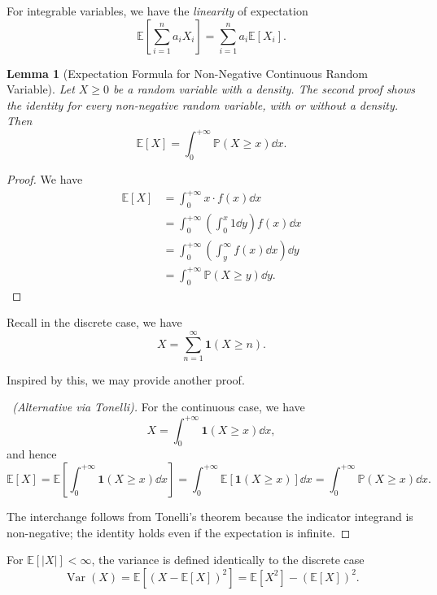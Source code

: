 \documentclass[11pt]{article}
\numberwithin{equation}{section}
\newtheorem{lemma}[theorem]{Lemma}
\theoremstyle{definition}
\theoremstyle{remark}
\newcommand{\pqty}[1]{\left(#1\right)}
\newcommand{\bqty}[1]{\left[#1\right]}
\newcommand{\plusinfty}{+\infty}
\newcommand{\indicator}{\mathbf 1}
\newcommand{\Prob}{\mathbb P}
\newcommand{\Expt}{\mathbb E}
\DeclareMathOperator{\Var}{Var}
\begin{document}
For integrable variables, we have the \emph{linearity} of expectation
\[
    \Expt\bqty{\sum_{i = 1}^{n} a_i X_i} = \sum_{i = 1}^{n} a_i \Expt\bqty{X_i}.
\]

\begin{lemma}[Expectation Formula for Non-Negative Continuous Random Variable]\label{probability-lemma-009}
    \label{probability-lem:formula-expectation-non-negative-continuous-random-variable}
    Let \(X\ge0\) be a random variable with a density. The second proof shows the identity for every non-negative random variable, with or without a density. Then
    \[
        \Expt\bqty{X} = \int_{0}^{\plusinfty} \Prob\pqty{X \geq x} \dd{x}.
    \]
\end{lemma}

\begin{proof}\label{probability-proof-059}
    We have
    \begin{align*}
        \Expt\bqty{X} &= \int_{0}^{\plusinfty} x \cdot f\pqty{x} \dd{x} \\
        &= \int_{0}^{\plusinfty} \pqty{\int_{0}^{x} 1 \dd{y}} f\pqty{x} \dd{x} \\
        &= \int_{0}^{\plusinfty} \pqty{\int_{y}^{\infty} f\pqty{x} \dd{x}} \dd{y} \\
        &= \int_{0}^{\plusinfty} \Prob\pqty{X \geq y} \dd{y}. 
    \end{align*}
\end{proof}

Recall in the discrete case, we have
\[
    X = \sum_{n = 1}^{\infty} \indicator\pqty{X \geq n}.
\]

Inspired by this, we may provide another proof.

\begin{proof}[\proofname\ (Alternative via Tonelli)]\label{probability-proof-060}
    For the continuous case, we have
    \[
        X = \int_{0}^{\plusinfty} \indicator\pqty{X \geq x} \dd{x},
    \]
    and hence
    \[
        \Expt\bqty{X} = \Expt\bqty{\int_{0}^{\plusinfty} \indicator\pqty{X \geq x} \dd{x}} = \int_{0}^{\plusinfty} \Expt\bqty{\indicator\pqty{X \geq x}} \dd{x} = \int_{0}^{\plusinfty} \Prob\pqty{X \geq x} \dd{x}.
    \]

    The interchange follows from Tonelli's theorem because the indicator integrand is non-negative; the identity holds even if the expectation is infinite.
\end{proof}

For \(\Expt[|X|]<\infty\), the variance is defined identically to the discrete case
\[
    \Var\pqty{X} = \Expt\bqty{\pqty{X - \Expt\bqty{X}}^2} = \Expt\bqty{X^2} - \pqty{\Expt\bqty{X}}^2.
\]
\end{document}
